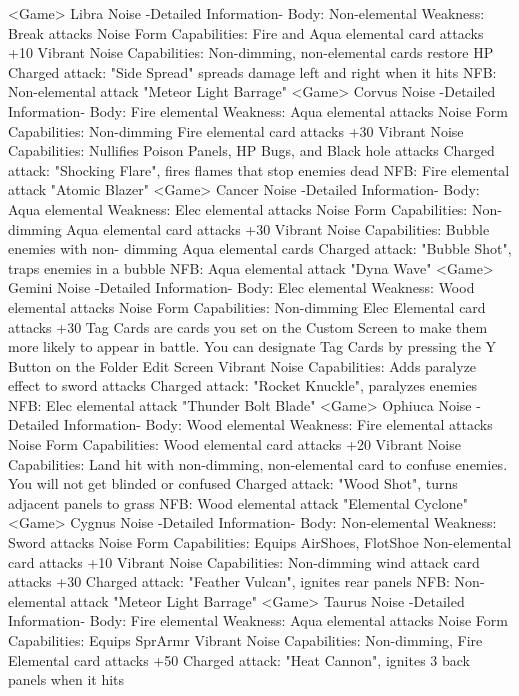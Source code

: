 <Game> Libra Noise -Detailed Information- 
Body: Non-elemental Weakness: Break attacks 
Noise Form Capabilities: Fire and Aqua elemental card attacks +10 
Vibrant Noise Capabilities: Non-dimming, non-elemental cards restore HP 
Charged attack: "Side Spread" spreads damage left and right when it hits 
NFB: Non-elemental attack "Meteor Light Barrage" 
<Game> Corvus Noise -Detailed Information- 
Body: Fire elemental Weakness: Aqua elemental attacks 
Noise Form Capabilities: Non-dimming Fire elemental card attacks +30 
Vibrant Noise Capabilities: Nullifies Poison Panels, HP Bugs, and Black hole attacks 
Charged attack: "Shocking Flare", fires flames that stop enemies dead 
NFB: Fire elemental attack "Atomic Blazer" 
<Game> Cancer Noise -Detailed Information- 
Body: Aqua elemental Weakness: Elec elemental attacks 
Noise Form Capabilities: Non-dimming Aqua elemental card attacks +30 
Vibrant Noise Capabilities: Bubble enemies with non- dimming Aqua elemental cards 
Charged attack: "Bubble Shot", traps enemies in a bubble 
NFB: Aqua elemental attack "Dyna Wave" 
<Game> Gemini Noise -Detailed Information- 
Body: Elec elemental Weakness: Wood elemental attacks 
Noise Form Capabilities: Non-dimming Elec Elemental card attacks +30 
Tag Cards are cards you set on the Custom Screen to make them more likely 
to appear in battle. You can designate Tag Cards by 
pressing the Y Button on the Folder Edit Screen 
Vibrant Noise Capabilities: Adds paralyze effect to sword attacks 
Charged attack: "Rocket Knuckle", paralyzes enemies 
NFB: Elec elemental attack "Thunder Bolt Blade" 
<Game> Ophiuca Noise -Detailed Information- 
Body: Wood elemental Weakness: Fire elemental attacks 
Noise Form Capabilities: Wood elemental card attacks +20 
Vibrant Noise Capabilities: Land hit with non-dimming, non-elemental card to 
confuse enemies. You will not get blinded or confused 
Charged attack: "Wood Shot", turns adjacent panels to grass 
NFB: Wood elemental attack "Elemental Cyclone" 
<Game> Cygnus Noise -Detailed Information- 
Body: Non-elemental Weakness: Sword attacks 
Noise Form Capabilities: Equips AirShoes, FlotShoe 
Non-elemental card attacks +10 
Vibrant Noise Capabilities: Non-dimming wind attack card attacks +30 
Charged attack: "Feather Vulcan", ignites rear panels 
NFB: Non-elemental attack "Meteor Light Barrage" 
<Game> Taurus Noise -Detailed Information- 
Body: Fire elemental Weakness: Aqua elemental attacks 
Noise Form Capabilities: Equips SprArmr 
Vibrant Noise Capabilities: Non-dimming, Fire Elemental card attacks +50 
Charged attack: "Heat Cannon", ignites 3 back panels when it hits 

